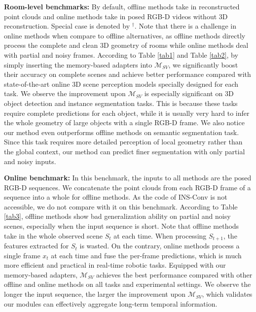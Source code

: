 \textbf{Room-level benchmarks:} By default, offline methods take in reconstructed point clouds and online methods take in posed RGB-D videos without 3D reconstruction. Special case is denoted by $^\dag$.
Note that there is a challenge in online methods when compare to offline alternatives, as offline methods directly process the complete and clean 3D geometry of rooms while online methods deal with partial and noisy frames. According to Table \ref{tab1} and Table \ref{tab2}, by simply inserting the memory-based adapters into $\mathcal{M}_{SV}$, we significantly boost their accuracy on complete scenes and achieve better performance compared with state-of-the-art online 3D scene perception models specially designed for each task. We observe the improvement upon $\mathcal{M}_{SV}$ is especially significant on 3D object detection and instance segmentation tasks. This is because these tasks require complete predictions for each object, while it is usually very hard to infer the whole geometry of large objects with a single RGB-D frame.
We also notice our method even outperforms offline methods on semantic segmentation task. Since this task requires more detailed perception of local geometry rather than the global context, our method can predict finer segmentation with only partial and noisy inputs.

\textbf{Online benchmark:} In this benchmark, the inputs to all methods are the posed RGB-D sequences. We concatenate the point clouds from each RGB-D frame of a sequence into a whole for offline methods. As the code of INS-Conv is not accessible, we do not compare with it on this benchmark. According to Table \ref{tab3}, offline methods show bad generalization ability on partial and noisy scenes, especially when the input sequence is short. Note that offline methods take in the whole observed scene $S_t$ at each time. When processing $S_{t+1}$, the features extracted for $S_t$ is wasted. On the contrary, online methods process a single frame $x_t$ at each time and fuse the per-frame predictions, which is much more efficient and practical in real-time robotic tasks. Equipped with our memory-based adapters, $\mathcal{M}_{SV}$ achieves the best performance compared with other offline and online methods on all tasks and experimental settings. We observe the longer the input sequence, the larger the improvement upon $\mathcal{M}_{SV}$, which validates our modules can effectively aggregate long-term temporal information.

